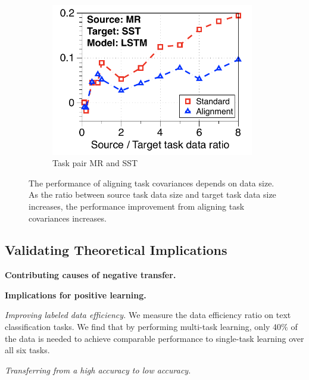 \begin{figure}[!ht]
\begin{subfigure}[b]{0.33\textwidth}
		\includegraphics[width=0.975\textwidth]{figures/ratio_alignment_mr_sst_lstm.pdf}
		\caption{Task pair MR and SST}
	\end{subfigure}
	\caption{The performance of aligning task covariances depends on data size. As the ratio between source task data size and target task data size increases, the performance improvement from aligning task covariances increases.}
	\label{fig_covariate}
\end{figure}


\subsection{Validating Theoretical Implications}


\textbf{Contributing causes of negative transfer.}

\textbf{Implications for positive learning.}


\textit{Improving labeled data efficiency.}
We measure the data efficiency ratio on text classification tasks.
We find that by performing multi-task learning, only 40$\%$ of the data is needed to achieve comparable performance to single-task learning over all six tasks.

\textit{Transferring from a high accuracy to low accuracy.}



